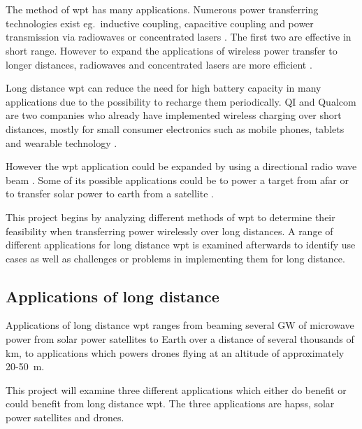\graphicspath{{figures/Part1/applications/}}

\chapter{} \label{ch:WPTPreanalysis}
The method of \gls{wpt} has many applications. Numerous power transferring technologies exist eg.~inductive coupling, capacitive coupling and power transmission via radiowaves or concentrated lasers \citep{book:shinohara}. The first two are effective in short range. However to expand the applications of wireless power transfer to longer distances, radiowaves and concentrated lasers are more efficient \citep{book:shinohara}.

Long distance \gls{wpt} can reduce the need for high battery capacity in many applications due to the possibility to recharge them periodically.
QI and Qualcom are two companies who already have implemented wireless charging over short distances, mostly for small consumer electronics such as mobile phones, tablets and wearable technology \citep{web:QI} \citep{web:Qualcom}. 

However the \gls{wpt} application could be expanded by using a directional radio wave beam \citep{book:shinohara}. Some of its possible applications could be to power a target from afar or to transfer solar power to earth from a satellite \citep{sci_art:andrea}. 

This project begins by analyzing different methods of \gls{wpt} to determine their feasibility when transferring power wirelessly over long distances. A range of different applications for long distance \gls{wpt} is examined afterwards to identify use cases as well as challenges or problems in implementing them for long distance.



\section{Applications of long distance }
Applications of long distance \gls{wpt} ranges from beaming several \si{\giga\watt} of microwave power from solar power satellites to Earth over a distance of several thousands of \si{\kilo\meter}, to  applications which powers drones flying at an altitude of approximately 20-\SI{50}{\meter}.

This project will examine three different applications which either do benefit or could benefit from long distance \gls{wpt}. The three applications are \glspl{haps}, solar power satellites and drones.


%

%

%

%